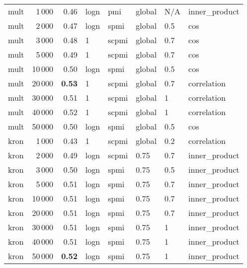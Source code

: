 \begin{tabular}{lrrlllll}
    mult &            1\,000 &  0.46 &  logn &    pmi &  global &  N/A &  inner\_product \\
    mult &            2\,000 &  0.47 &  logn &   spmi &  global &  0.5 &            cos \\
    mult &            3\,000 &  0.48 &     1 &  scpmi &  global &  0.7 &            cos \\
    mult &            5\,000 &  0.49 &     1 &  scpmi &  global &  0.7 &            cos \\
    mult &           10\,000 &  0.50 &  logn &   spmi &  global &  0.5 &            cos \\
    mult &           20\,000 &  \textbf{0.53} &     1 &  scpmi &  global &  0.7 &    correlation \\
    mult &           30\,000 &  0.51 &     1 &  scpmi &  global &    1 &    correlation \\
    mult &           40\,000 &  0.52 &     1 &  scpmi &  global &    1 &    correlation \\
    mult &           50\,000 &  0.50 &  logn &   spmi &  global &  0.5 &            cos \\ \addlinespace
    kron &            1\,000 &  0.43 &     1 &  scpmi &  global &  0.2 &    correlation \\
    kron &            2\,000 &  0.49 &  logn &  scpmi &    0.75 &  0.7 &  inner\_product \\
    kron &            3\,000 &  0.50 &  logn &   spmi &    0.75 &  0.5 &  inner\_product \\
    kron &            5\,000 &  0.51 &  logn &   spmi &    0.75 &  0.7 &  inner\_product \\
    kron &           10\,000 &  0.51 &  logn &   spmi &    0.75 &  0.7 &  inner\_product \\
    kron &           20\,000 &  0.51 &  logn &   spmi &    0.75 &  0.7 &  inner\_product \\
    kron &           30\,000 &  0.51 &  logn &   spmi &    0.75 &    1 &  inner\_product \\
    kron &           40\,000 &  0.51 &  logn &   spmi &    0.75 &    1 &  inner\_product \\
    kron &           50\,000 &  \textbf{0.52} &  logn &   spmi &    0.75 &    1 &  inner\_product \\
\bottomrule
\end{tabular}
